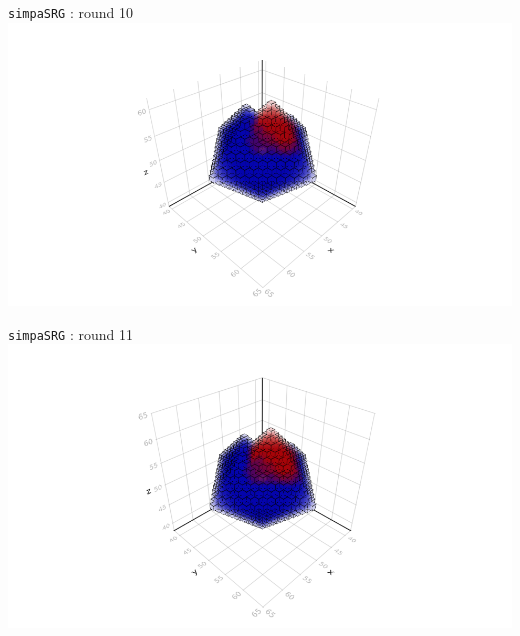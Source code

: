 \documentclass{beamer}
\begin{document}
\begin{frame}{\texttt{simpaSRG} : round 10}
\includegraphics[trim=5cm 0.7cm 5cm 3cm, clip, width=1\linewidth]{algorithm_visualisation/srgthreads2/srg2threads10.png}\\
\end{frame}
\begin{frame}{\texttt{simpaSRG} : round 11}
\includegraphics[trim=5cm 0.7cm 5cm 3cm, clip, width=1\linewidth]{algorithm_visualisation/srgthreads2/srg2threads11.png}\\
\end{frame}
\end{document}

